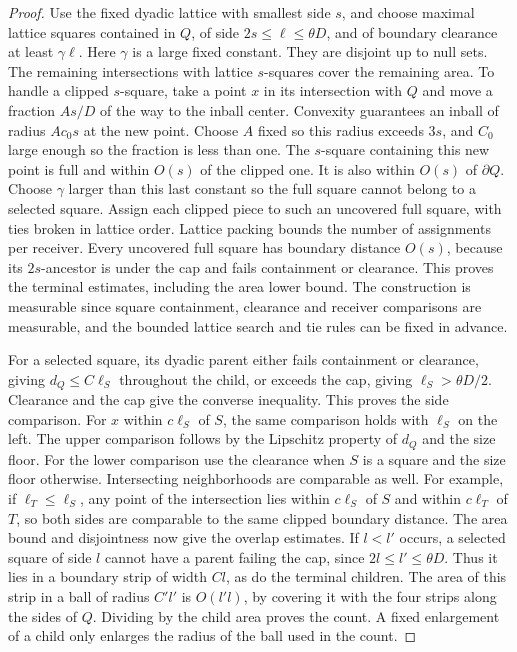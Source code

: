 \documentclass[11pt]{article}
\newcommand{\1}{\mathbf{1}}
\numberwithin{equation}{section}
\begin{document}
\begin{proof}
Use the fixed dyadic lattice with smallest side \(s\), and choose
maximal lattice squares contained in \(Q\), of side
\(2s\le\ell\le\theta D\), and of boundary clearance at least
\(\gamma\ell\). Here \(\gamma\) is a large fixed constant. They
are disjoint up to null sets. The remaining intersections
with lattice \(s\)-squares cover the remaining area. To handle
a clipped \(s\)-square, take a point \(x\) in its intersection
with \(Q\) and move a fraction \(A s/D\) of the way to the
inball center. Convexity guarantees an inball of radius
\(A c_0s\) at the new point. Choose \(A\) fixed so this radius
exceeds \(3s\), and \(C_0\) large enough so the fraction is
less than one. The \(s\)-square containing this new point is
full and within \(O(s)\) of the clipped one. It is also within
\(O(s)\) of \(\partial Q\). Choose \(\gamma\) larger than this
last constant so the full square cannot belong to a selected
square. Assign each clipped piece to such an uncovered full
square, with ties broken in lattice order. Lattice packing
bounds the number of assignments per receiver. Every uncovered
full square has boundary distance \(O(s)\), because its
\(2s\)-ancestor is under the cap and fails containment or
clearance. This proves the terminal estimates, including the
area lower bound. The construction is measurable since square
containment, clearance and receiver comparisons are measurable,
and the bounded lattice search and tie rules can be fixed
in advance.

For a selected square, its dyadic parent either fails
containment or clearance, giving \(d_Q\le C\ell_S\) throughout
the child, or exceeds the cap, giving \(\ell_S>\theta D/2\).
Clearance and the cap give the converse inequality. This proves
the side comparison. For \(x\) within \(c\ell_S\) of \(S\),
the same comparison holds with \(\ell_S\) on the left. The
upper comparison follows by the Lipschitz property of \(d_Q\)
and the size floor. For the lower comparison use the clearance
when \(S\) is a square and the size floor otherwise. Intersecting
neighborhoods are comparable as well. For example, if
\(\ell_T\le\ell_S\), any point of the intersection lies within
\(c\ell_S\) of \(S\) and within \(c\ell_T\) of \(T\), so both
sides are comparable to the same clipped boundary distance.
The area bound and disjointness now give the overlap estimates.
If \(l<l'\) occurs, a selected square of side \(l\) cannot
have a parent failing the cap, since \(2l\le l'\le\theta D\).
Thus it lies in a boundary strip of width \(Cl\), as do the
terminal children. The area of this strip in a ball of radius
\(C'l'\) is \(O(l'l)\), by covering it with the four strips
along the sides of \(Q\). Dividing by the child area proves
the count. A fixed enlargement of a child only enlarges
the radius of the ball used in the count.
\end{proof}
\end{document}
